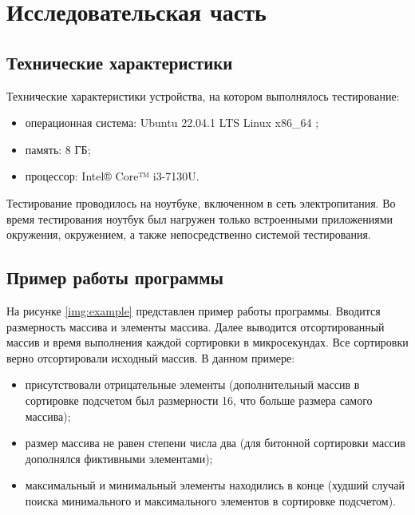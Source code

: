 \chapter{Исследовательская часть}

\section{Технические характеристики}

Технические характеристики устройства, на котором выполнялось тестирование:
\begin{itemize}
	\item операционная система: Ubuntu 22.04.1 LTS Linux x86\_64 \cite{ubuntu};
	\item память: 8 ГБ;
	\item процессор: Intel® Core™ i3-7130U.
\end{itemize}

Тестирование проводилось на ноутбуке, включенном в сеть электропитания. Во время тестирования ноутбук был нагружен только встроенными приложениями окружения, окружением, а также непосредственно системой тестирования.

\section{Пример работы программы}

На рисунке \ref{img:example} представлен пример работы программы. Вводится размерность массива и элементы массива. Далее выводится отсортированный массив и время выполнения каждой сортировки в микросекундах. Все сортировки верно отсортировали исходный массив.  
В данном примере:
\begin{itemize}
	\item присутствовали отрицательные элементы (дополнительный массив в сортировке подсчетом был размерности 16, что больше размера самого массива);
	\item размер массива не равен степени числа два (для битонной сортировки массив дополнялся фиктивными элементами);
	\item максимальный и минимальный элементы находились в конце (худший случай поиска минимального и максимального элементов в сортировке подсчетом).
\end{itemize} 


